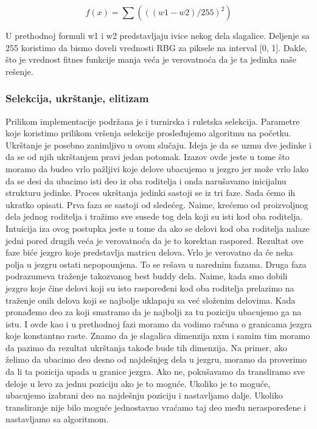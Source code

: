 \documentclass{article}
\begin{document}
$$f(x) = \sum(((w1- w2)/255)^2)$$

U prethodnoj formuli w1 i w2 predstavljaju ivice nekog dela slagalice. Deljenje sa 255 koristimo da bismo doveli vrednosti RBG za piksele na interval [0, 1]. Dakle, što je vrednost fitnes funkcije manja veća je verovatnoća da je ta jedinka naše rešenje.

\subsubsection{Selekcija, ukrštanje, elitizam}
Prilikom implementacije podržana je i turnirska i ruletska selekcija. Parametre koje koristimo prilikom vršenja selekcije prosleđujemo algoritmu na početku.\newline\newline
Ukrštanje je posebno zanimljivo u ovom slučaju. Ideja je da se uzmu dve jedinke i da se od njih ukrštanjem pravi jedan potomak. Izazov ovde jeste u tome što moramo da budeo vrlo pažljivi koje delove ubacujemo u jezgro jer može vrlo lako da se desi da ubacimo isti deo iz oba roditelja i onda narušavamo inicijalnu strukturu jedinke. Proces ukrštanja jedinki sastoji se iz tri faze. Sada ćemo ih ukratko opisati.\newline\newline
Prva faza se sastoji od sledećeg. Naime, krećemo od proizvoljnog dela jednog roditelja i tražimo sve susede tog dela koji su isti kod oba roditelja. Intuicija iza ovog postupka jeste u tome da ako se delovi kod oba roditelja nalaze jedni pored drugih veća je verovatnoća da je to korektan raspored. Rezultat ove faze biće jezgro koje predstavlja matricu delova. Vrlo je verovatno da će neka polja u jezgru ostati nepopounjena. To se rešava u narednim fazama.\newline\newline
Druga faza podrazumeva traženje takozvanog best buddy dela. Naime, kada smo dobili jezgro koje čine delovi koji su isto raspoređeni kod oba roditelja prelazimo na traženje onih delova koji se najbolje uklapaju sa već složenim delovima. Kada pronađemo deo za koji smatramo da je najbolji za tu poziciju ubacujemo ga na istu. I ovde kao i u prethodnoj fazi moramo da vodimo računa o granicama jezgra koje konstantno raste. Znamo da je slagalica dimenzija nxm i samim tim moramo da pazimo da rezultat ukrštanja takođe bude tih dimenzija. Na primer, ako želimo da ubacimo deo desno od najdešnjeg dela u jezgru, moramo da proverimo da li ta pozicija upada u granice jezgra. Ako ne, pokušavamo da transliramo sve deloje u levo za jednu poziciju ako je to moguće. Ukoliko je to moguće, ubacujemo izabrani deo na najdešnju poziciju i nastavljamo dalje. Ukoliko transliranje nije bilo moguće jednostavno vraćamo taj deo među neraspoređene i nastavljamo sa algoritmom.\newline\newline
\end{document}
